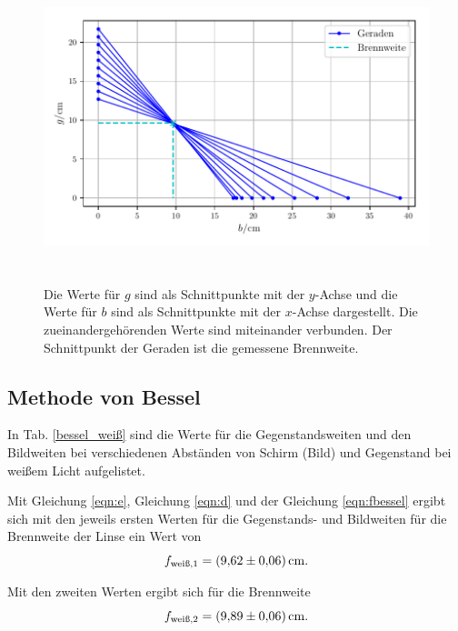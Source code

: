 \begin{figure}
    \centering
    \includegraphics[width=14cm, height=9cm]{build/plot1.pdf}
    \caption{Die Werte für $g$ sind als Schnittpunkte mit der $y$-Achse und die Werte für $b$ sind als Schnittpunkte mit der $x$-Achse dargestellt. Die zueinandergehörenden Werte sind miteinander verbunden. Der Schnittpunkt der Geraden ist die gemessene Brennweite.}
    \label{fig:brennweite}
\end{figure}



\subsection{Methode von Bessel}

In Tab. \ref{bessel_weiß} sind die Werte für die Gegenstandsweiten und den Bildweiten bei verschiedenen Abständen von Schirm (Bild) und Gegenstand bei weißem Licht aufgelistet.



\noindent Mit Gleichung \eqref{eqn:e}, Gleichung \eqref{eqn:d} und der Gleichung \eqref{eqn:fbessel} ergibt sich mit den jeweils ersten Werten für die Gegenstands- und Bildweiten für die Brennweite der Linse ein Wert von 
\begin{equation*}
    f_\text{weiß,1} = \SI{9.62 \pm 0.06}{\centi\meter}.
\end{equation*}

\noindent Mit den zweiten Werten ergibt sich für die Brennweite
\begin{equation*}
    f_\text{weiß,2} = \SI{9.89 \pm 0.06}{\centi\meter}.
\end{equation*}

